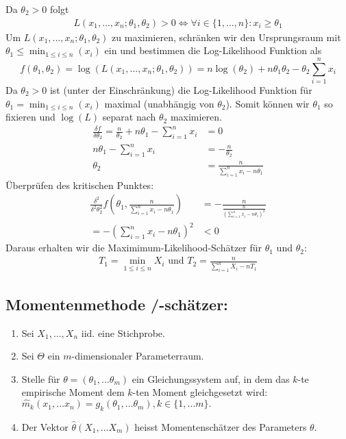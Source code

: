 Da $\theta_2 > 0$ folgt 
\begin{align*}
    L(x_1, ..., x_n; \theta_1, \theta_2) > 0 \iff \forall i \in \{1, \dots, n\}: x_i \geq \theta_1
\end{align*}
Um $L(x_1, ..., x_n; \theta_1, \theta_2)$ zu maximieren, schränken wir den Ursprungsraum mit $\theta_1 \leq \min_{1 \leq i \leq n}(x_i)$ ein 
und bestimmen die Log-Likelihood Funktion als
$$f(\theta_1, \theta_2) = \log\left(L(x_1, ..., x_n; \theta_1, \theta_2)\right) = n \log(\theta_2) + n \theta_1\theta_2 - \theta_2 \sum_{i = 1}^n x_i$$
Da $\theta_2 > 0$ ist (unter der Einschränkung) die Log-Likelihood Funktion für $\theta_1 = \min_{1 \leq i \leq n}(x_i)$ maximal (unabhängig von $\theta_2$).
Somit können wir $\theta_1$ so fixieren und $\log(L)$ separat nach $\theta_2$ maximieren. 
\begin{align*}
    \frac{\delta f}{\delta \theta_2} = \frac{n}{\theta_2} + n\theta_1 - \sum_{i = 1}^n x_i&= 0\\
    n\theta_1 - \sum_{i = 1}^n x_i&= -\frac{n}{\theta_2}\\
    \theta_2 &= \frac{n}{\sum_{i = 1}^n x_i - n \theta_1}
\end{align*}
Überprüfen des kritischen Punktes:
\begin{align*}
     \frac{\delta^2}{\delta^2\theta_2^2}f\left(\theta_1, \frac{n}{\sum_{i = 1}^n x_i - n\theta_1}\right) &= -\frac{n}{\frac{n}{\left(\sum_{i = 1}^n x_i - n\theta_1\right)^2}}\\
     = -\left(\sum_{i = 1}^n x_i - n \theta_1\right)^2 &< 0
\end{align*}
Daraus erhalten wir die Maximimum-Likelihood-Schätzer für $\theta_1$ und $\theta_2$:
\begin{align*}
    T_1 = \min_{1\leq i \leq n}X_i \text{ und } T_2 = \frac{n}{\sum_{i=1}^n X_i - nT_1}
\end{align*}

\subsection{Momentenmethode /-schätzer:} 
\begin{enumerate}
	\item Sei $X_1, ..., X_n$ iid. eine Stichprobe. 
	\item Sei $\Theta$ ein $m$-dimensionaler Parameterraum. 
	\item Stelle für $\theta = (\theta_1,\dots \theta_m)$ ein Gleichungssystem auf, in dem das $k$-te empirische Moment dem $k$-ten Moment gleichgesetzt wird: $\hat m_k(x_1,\dots x_n) = g_k(\theta_1,\dots \theta_m), k \in \{1,\dots m\}.$ 
	\item Der Vektor $\hat \theta(X_1,\dots X_m)$ heisst Momentenschätzer des Parameters $\theta.$ 
\end{enumerate}
